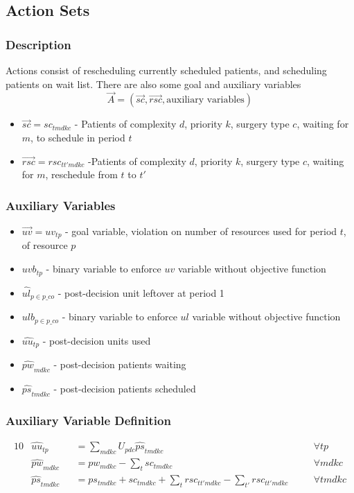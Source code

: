 \subsection{Action Sets}
\subsubsection{Description}
Actions consist of rescheduling currently scheduled patients, and scheduling patients on wait list. There are also some goal and auxiliary variables
\[  \vec{A} = (\vec{sc}, \vec{rsc}, \text{auxiliary variables}) \] 
\begin{itemize}
	\item $\vec{sc} = sc_{tmdkc}$ - Patients of complexity $d$, priority $k$,  surgery type $c$, waiting for $m$, to schedule in period $t$
	\item $\vec{rsc} = rsc_{tt'mdkc}$ -Patients of complexity $d$, priority $k$, surgery type $c$, waiting for $m$, reschedule from $t$ to $t'$
\end{itemize}

\subsubsection{Auxiliary Variables}
\begin{itemize}
	\item $\vec{uv} = uv_{tp}$ - goal variable, violation on number of resources used for period $t$, of resource $p$
	\item $uvb_{tp}$ - binary variable to enforce $uv$ variable without objective function
	\item $\hat{ul}_{p \in p\_co}$ - post-decision unit leftover at period 1
	\item $ulb_{p \in p\_co}$ - binary variable to enforce $ul$ variable without objective function
	\item $\hat{uu}_{tp}$ - post-decision units used
	\item $\hat{pw}_{mdkc}$ - post-decision patients waiting
	\item $\hat{ps}_{tmdkc}$ - post-decision patients scheduled
\end{itemize}
\subsubsection{Auxiliary Variable Definition}
\label{auxiliary constraints}
\begin{alignat}{10}
	& \hat{uu}_{tp} 
	&& =  \sum_{mdkc} U_{pdc} \hat{ps}_{tmdkc} \quad
	&& \forall tp \\ 
	& \hat{pw}_{mdkc} 
	&& = pw_{mdkc} - \sum_{t} sc_{tmdkc} \quad 
	&& \forall mdkc \\ 
	& \hat{ps}_{tmdkc} 
	&& = ps_{tmdkc} + sc_{tmdkc} + 
	\sum_{t} rsc_{tt'mdkc} - \sum_{t'} rsc_{tt'mdkc} \quad 
	&& \forall tmdkc
\end{alignat}

